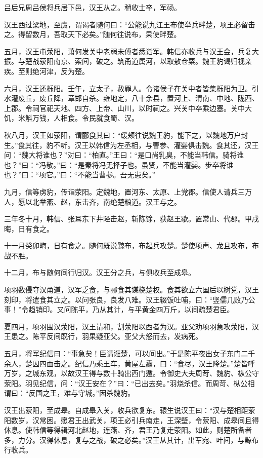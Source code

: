 \documentclass[]{article}
\begin{document}
吕后兄周吕侯将兵居下邑，汉王从之。稍收士卒，军砀。

汉王西过梁地，至虞，谓谒者随何曰：``公能说九江王布使举兵畔楚，项王必留击之。得留数月，吾取天下必矣。''随何往说布，果使畔楚。

五月，汉王屯荥阳，萧何发关中老弱未傅者悉诣军。韩信亦收兵与汉王会，兵复大振。与楚战荥阳南京、索间，破之。筑甬道属河，以取敖仓粟。魏王豹谒归视亲疾。至则绝河津，反为楚。

六月，汉王还栎阳。壬午，立太子，赦罪人。令诸侯子在关中者皆集栎阳为卫。引水灌废丘，废丘降，章邯自杀。雍地定，八十余县，置河上、渭南、中地、陇西、上郡。令祠官祀天地、四方、上帝、山川，以时祠之。兴关中卒乘边塞。关中大饥，米斛万钱，人相食。令民就食蜀、汉。

秋八月，汉王如荥阳，谓郦食其曰：``缓颊往说魏王豹，能下之，以魏地万户封生。''食其往，豹不听。汉王以韩信为左丞相，与曹参、灌婴俱击魏。食其还，汉王问：``魏大将谁也？''对曰：``柏直。''王曰：``是口尚乳臭，不能当韩信。骑将谁也？''曰：``冯敬。''曰：``是秦将冯无择子也。虽贤，不能当灌婴。步卒将谁也？''曰：``项它。''曰：``不能当曹参。吾无患矣。''

九月，信等虏豹，传诣荥阳。定魏地，置河东、太原、上党郡。信使人请兵三万人，愿以北举燕、赵，东击齐，南绝楚粮道。汉王与之。

三年冬十月，韩信、张耳东下井陉击赵，斩陈馀，获赵王歇。置常山、代郡。甲戌晦，日有食之。

十一月癸卯晦，日有食之。随何既说黥布，布起兵攻楚。楚使项声、龙且攻布，布战不胜。

十二月，布与随何间行归汉。汉王分之兵，与俱收兵至成皋。

项羽数侵夺汉甬道，汉军乏食，与郦食其谋桡楚权。食其欲立六国后以树党，汉王刻印，将遣食其立之。以问张良，良发八难。汉王辍饭吐哺，曰：``竖儒几败乃公事！''令趋销印。又问陈平，乃从其计，与平黄金四万斤，以间疏楚君臣。

夏四月，项羽围汉荥阳，汉王请和，割荥阳以西者为汉。亚父劝项羽急攻荥阳，汉王患之。陈平反间既行，羽果疑亚父。亚父大怒而去，发病死。

五月，将军纪信曰：``事急矣！臣请诳楚，可以间出。''于是陈平夜出女子东门二千余人，楚因四面击之。纪信乃乘王车，黄屋左纛，曰：``食尽，汉王降楚。''楚皆呼万岁，之城东观，以故汉王得与数十骑出西门遁。令御史大夫周苛、魏豹、枞公守荥阳。羽见纪信，问：``汉王安在？''曰：``已出去矣。''羽烧杀信。而周苛、枞公相谓曰：``反国之王，难与守城。''因杀魏豹。

汉王出荥阳，至成皋。自成皋入关，收兵欲复东。辕生说汉王曰：``汉与楚相距荥阳数岁，汉常困。愿君王出武关，项王必引兵南走，王深壁，令荥阳、成皋间且得休息。使韩信等得辑河北赵地，连燕、齐，君王乃复走荥阳。如此，则楚所备者多，力分。汉得休息，复与之战，破之必矣。''汉王从其计，出军宛、叶间，与黥布行收兵。
\end{document}
